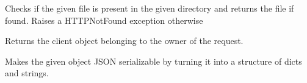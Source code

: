 \documentclass[letterpaper,10pt,english]{sphinxmanual}
\begin{document}

\begin{fulllineitems}
\label{\detokenize{src:src.utils.find_in_dir}}
Checks if the given file is present in the given directory and returns the file if found.
Raises a HTTPNotFound exception otherwise

\end{fulllineitems}


\begin{fulllineitems}
\label{\detokenize{src:src.utils.get_client}}
Returns the client object belonging to the owner of the request.

\end{fulllineitems}


\begin{fulllineitems}
\label{\detokenize{src:src.utils.make_serializable}}
Makes the given object JSON serializable by turning it into a structure of dicts and strings.

\end{fulllineitems}

\end{document}
